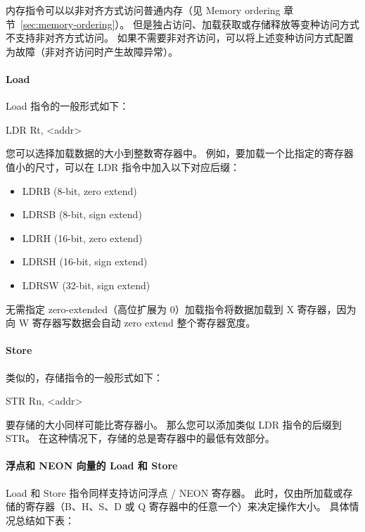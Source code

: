 内存指令可以以非对齐方式访问普通内存（见 Memory ordering 章节~\ref{sec:memory-ordering}）。
但是独占访问、加载获取或存储释放等变种访问方式不支持非对齐方式访问。
如果不需要非对齐访问，可以将上述变种访问方式配置为故障（非对齐访问时产生故障异常）。

\paragraph{Load}

Load 指令的一般形式如下：

\begin{lstcode}[language={[ARM]Assembler}]
  LDR Rt, <addr>
\end{lstcode}

您可以选择加载数据的大小到整数寄存器中。
例如，要加载一个比指定的寄存器值小的尺寸，可以在 LDR 指令中加入以下对应后缀：
\begin{itemize}
  \item LDRB (8-bit, zero extend)
  \item LDRSB (8-bit, sign extend)
  \item LDRH (16-bit, zero extend)
  \item LDRSH (16-bit, sign extend)
  \item LDRSW (32-bit, sign extend)
\end{itemize}

无需指定 zero-extended（高位扩展为 0）加载指令将数据加载到 X 寄存器，因为向 W 寄存器写数据会自动 zero extend 整个寄存器宽度。

\paragraph{Store}

类似的，存储指令的一般形式如下：

\begin{lstcode}[language={[ARM]Assembler}]
  STR Rn, <addr>
\end{lstcode}

要存储的大小同样可能比寄存器小。
那么您可以添加类似 LDR 指令的后缀到 STR。
在这种情况下，存储的总是寄存器中的最低有效部分。

\paragraph{浮点和 NEON 向量的 Load 和 Store}

Load 和 Store 指令同样支持访问浮点 / NEON 寄存器。
此时，仅由所加载或存储的寄存器（B、H、S、D 或 Q 寄存器中的任意一个）来决定操作大小。
具体情况总结如下表：

